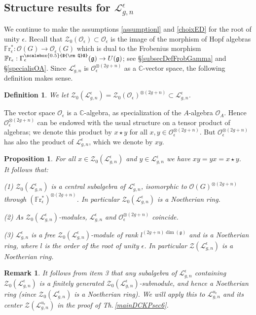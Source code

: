 \documentclass[11pt]{amsart}
\newtheorem{prop}[teo]{Proposition}
\newtheorem{defi}[teo]{Definition}
\newtheorem{remark}[teo]{Remark}
\newcommand{\e}{\epsilon}
\newcommand{\Ll}{\mathcal{L}}
\newcommand{\Oo}{\mathcal{O}}
\newcommand{\Q}{{\scalebox{0.5}{${\rm Q}$}}}
\begin{document}
\subsection{Structure results for \texorpdfstring{$\mathcal{L}_{g,n}^\e$}{graph algebras at roots of unity}}\label{subsecStructResLgnEps}
We continue to make the assumptions \eqref{assumptionl} and \eqref{choixED} for the root of unity $\epsilon$. Recall that $\mathcal{Z}_0(\Oo_\e) \subset \Oo_\e$ is the image of the morphism of Hopf algebras $\mathbb{F}\mathrm{r}^*_\e : \mathcal{O}(G) \to \Oo_\e(G)$ which is dual to the Frobenius morphism $\mathbb{F}\mathrm{r}_\e : \Gamma_\e^\Q(\mathfrak{g}) \to U(\mathfrak{g})$; see \S\ref{subsecDefFrobGamma} and \S\ref{specialisOA}. Since $\mathcal{L}_{g,n}^\e$ is $\Oo_\e^{\otimes (2g+n)}$ as a $\mathbb{C}$-vector space, the following definition makes sense.
\begin{defi}\label{defZ0Lgn}
We let $\mathcal{Z}_0(\mathcal{L}_{g,n}^\e) = \mathcal{Z}_0(\Oo_\e)^{\otimes (2g+n)} \subset \mathcal{L}_{g,n}^\e$. 
\end{defi}
\indent The vector space $\Oo_\e$ is a $\mathbb{C}$-algebra, as specialization of the $A$-algebra $\mathcal{O}_A$. Hence $\Oo_\e^{\otimes (2g+n)}$ can be endowed with the usual structure on a tensor product of algebras; we denote this product by $x \star y$ for all $x,y \in \Oo_\e^{\otimes (2g+n)}$. But $\Oo_\e^{\otimes (2g+n)}$ has also the product of $\mathcal{L}_{g,n}^\e$, which we denote by $xy$.
\begin{prop}\label{Z0Lgn}
For all $x \in \mathcal{Z}_0(\mathcal{L}_{g,n}^\e)$ and $y \in \mathcal{L}_{g,n}^\e$ we have $xy = yx = x \star y$.
\\It follows that:

\noindent (1) $\mathcal{Z}_0(\Ll_{g,n}^{\e})$ is a central subalgebra of $\Ll_{g,n}^{\e}$, isomorphic to $\Oo(G)^{\otimes (2g+n)}$ through $(\mathbb{F}\mathrm{r}_\e^{*})^{\otimes (2g+n)}$. In particular $\mathcal{Z}_0(\Ll_{g,n}^{\e})$ is a Noetherian ring.

\noindent (2) As $\mathcal{Z}_0(\Ll_{g,n}^{\e})$-modules, $\Ll_{g,n}^{\e}$ and $\Oo_{\e}^{\otimes (2g+n)}$ coincide. 

\noindent (3) $\Ll_{g,n}^{\e}$ is a free $\mathcal{Z}_0(\Ll_{g,n}^{\e})$-module of rank $l^{(2g+n)\dim(\mathfrak{g})}$ and is a Noetherian ring, where $l$ is the order of the root of unity $\e$. In particular $\mathcal{Z}(\Ll_{g,n}^{\e})$ is a Noetherian ring.
\end{prop}
\begin{remark}\label{Z0submoduleLgn} {\rm It follows from item 3 that any subalgebra of $\Ll_{g,n}^\e$ containing  $\mathcal{Z}_0(\Ll_{g,n}^{\e})$ is a finitely generated $\mathcal{Z}_0(\Ll_{g,n}^{\e})$-submodule, and hence a Noetherian ring (since $\mathcal{Z}_0(\Ll_{g,n}^{\e})$ is a Noetherian ring). We will apply this to $\Ll_{g,n}^{u_\e}$ and its center $\mathcal{Z}(\Ll_{g,n}^{u_\e})$ in the proof of Th.\,\ref{mainDCKPsec6}.}
\end{remark}
\end{document}

